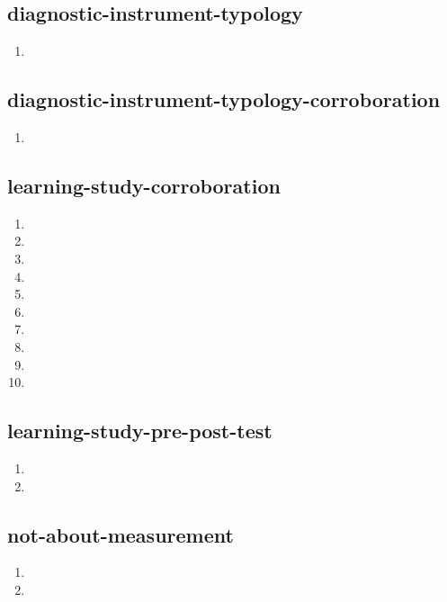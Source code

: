 \documentclass{article}
\begin{document}
\subsection{diagnostic-instrument-typology}
\begin{enumerate}
\item {}
\end{enumerate}

\subsection{diagnostic-instrument-typology-corroboration}
\begin{enumerate}
\item {}
\end{enumerate}

\subsection{learning-study-corroboration}
\begin{enumerate}
\item {}
\item {}
\item {}
\item {}
\item {}
\item {}
\item {}
\item {}
\item {}
\item {}
\end{enumerate}

\subsection{learning-study-pre-post-test}
\begin{enumerate}
\item {}
\item {}
\end{enumerate}

\subsection{not-about-measurement}
\begin{enumerate}
\item {}
\item {}
\end{enumerate}
\end{document}
